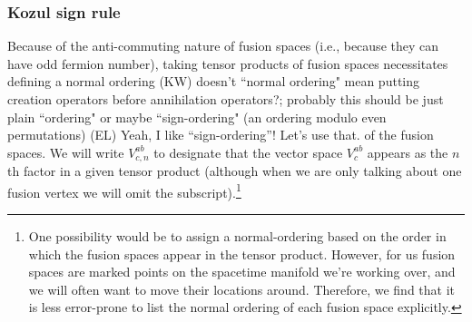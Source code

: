 \documentclass[12pt,a4paper]{article}
\newcommand{\ethan}[1]{{\color{amethyst}\footnotesize{(EL) #1}}}
\newcommand{\kw}[1]{{\color{kwcolor}\footnotesize{(KW) #1}}}
\begin{document}
\subsubsection{Kozul sign rule} Because of the anti-commuting nature of fusion spaces (i.e., because they can have odd fermion number), taking tensor products of fusion spaces necessitates defining a normal ordering 
\kw{doesn't ``normal ordering" mean putting creation operators before annihilation operators?;
probably this should be just plain ``ordering" or maybe ``sign-ordering" (an ordering modulo even permutations)} \ethan{Yeah, I like ``sign-ordering''! Let's use that.}
of the fusion spaces. 
We will write $V^{ab}_{c,n}$ to designate that the vector space $V^{ab}_c$ appears as the $n$th factor in a given tensor product (although when we are only talking about one fusion vertex we will omit the subscript).\footnote{One 
possibility would be to assign a normal-ordering based on the order in which the fusion spaces appear in the tensor product. 
However, for us fusion spaces are marked points on the spacetime manifold we're working over, and we will often want to move their locations around. 
Therefore, we find that it is less error-prone to list the normal ordering of each fusion space explicitly.}
\end{document}

